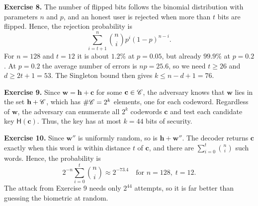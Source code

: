 \documentclass[../../book]{subfiles}
\begin{document}
\textbf{Exercise 8.} The number of flipped bits follows the binomial distribution with parameters $n$ and $p$, and an honest user is rejected when more than $t$ bits are flipped. Hence, the rejection probability is
\begin{equation*}
    \sum_{i=t+1}^{n} \binom{n}{i} p^i (1-p)^{n-i}.
\end{equation*}
For $n = 128$ and $t = 12$ it is about $1.2\%$ at $p = 0.05$, but already $99.9\%$ at $p = 0.2$. At $p = 0.2$ the average number of errors is $np = 25.6$, so we need $t \geq 26$ and $d \geq 2t + 1 = 53$. The Singleton bound then gives $k \leq n - d + 1 = 76$.

\textbf{Exercise 9.} Since $\mathbf{w} = \mathbf{h} + \mathbf{c}$ for some $\mathbf{c} \in \mathscr{C}$, the adversary knows that $\mathbf{w}$ lies in the set $\mathbf{h} + \mathscr{C}$, which has $\#\mathscr{C} = 2^k$ elements, one for each codeword. Regardless of $\mathbf{w}$, the adversary can enumerate all $2^k$ codewords $\mathbf{c}$ and test each candidate key $\mathsf{H}(\mathbf{c})$. Thus, the key has at most $k = 44$ bits of security.

\textbf{Exercise 10.} Since $\mathbf{w}''$ is uniformly random, so is $\mathbf{h} + \mathbf{w}''$. The decoder returns $\mathbf{c}$ exactly when this word is within distance $t$ of $\mathbf{c}$, and there are $\sum_{i=0}^{t} \binom{n}{i}$ such words. Hence, the probability is
\begin{equation*}
    2^{-n} \sum_{i=0}^{t} \binom{n}{i} \approx 2^{-73.4} \quad \text{for } n = 128, \; t = 12.
\end{equation*}
The attack from Exercise 9 needs only $2^{44}$ attempts, so it is far better than guessing the biometric at random.
\end{document}
